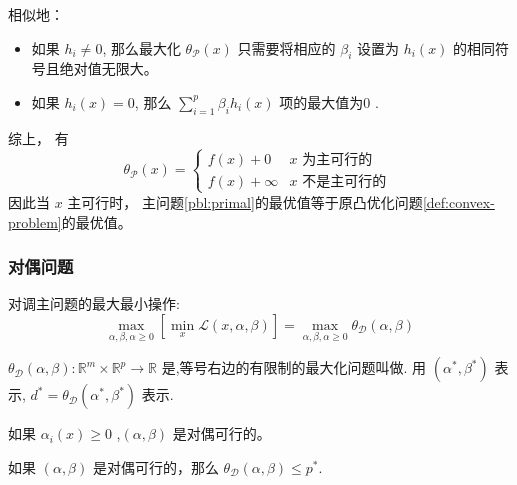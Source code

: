 相似地：

\begin{itemize}
    \item 如果 $ h_{i} \neq 0 $, 那么最大化 $ \theta_{\mathcal{P}}(x) $ 只需要将相应的 $ \beta_{i} $ 设置为 $ h_{i}(x) $ 的相同符号且绝对值无限大。
    \item 如果 $ h_{i}(x)=0 $, 那么 $ \sum_{i=1}^{p} \beta_{i} h_{i}(x) $ 项的最大值为0 .
\end{itemize}

综上， 有
\begin{equation}
\theta_{\mathcal{P}}(x)=\left\{\begin{array}{ll}
f(x)+0 & x \text { 为主可行的 } \\
f(x)+\infty & x \text { 不是主可行的 }
\end{array}\right.
\end{equation}
因此当 $ x $ 主可行时， 主问题\ref{pbl:primal}的最优值等于原凸优化问题\ref{def:convex-problem}的最优值。

\subsubsection{对偶问题}

\begin{definition}[对偶问题]
    对调主问题的最大最小操作:
\begin{equation}
\max _{\alpha, \beta, \alpha \geqslant 0}\left[\min _{x} \mathcal{L}(x, \alpha, \beta)\right]=\max _{\alpha, \beta, \alpha \geqslant 0} \theta_{\mathcal{D}}(\alpha, \beta)
\end{equation}

$ \theta_{\mathcal{D}}(\alpha, \beta): \mathbb{R}^{m} \times \mathbb{R}^{p} \rightarrow \mathbb{R} $ 是,等号右边的有限制的最大化问题叫做. 用 $ \left(\alpha^{*}, \beta^{*}\right) $ 表示, $ d^{*}=\theta_{\mathcal{D}}\left(\alpha^{*}, \beta^{*}\right) $ 表示.
\end{definition}

\begin{definition}[对偶可行]
    如果 $ \alpha_{i}(x) \geqslant 0 $ ,$ (\alpha, \beta) $ 是对偶可行的。
\end{definition}


\begin{theorem}
    如果 $ (\alpha, \beta) $ 是对偶可行的，那么 $ \theta_{\mathcal{D}}(\alpha, \beta) \leqslant p^{*} $.
\end{theorem}

